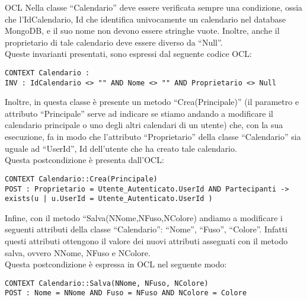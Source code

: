 \begin{listaPersonale}{OCL}
    Nella classe “Calendario” deve essere verificata sempre una condizione, ossia che l'IdCalendario, Id che identifica univocamente un calendario nel database MongoDB, e il suo nome non devono essere stringhe vuote. Inoltre, anche il proprietario di tale calendario deve essere diverso da “Null”.\\
    Queste invarianti presentati, sono espressi dal seguente codice OCL:
    \begin{lstlisting}
CONTEXT Calendario :
INV : IdCalendario <> "" AND Nome <> "" AND Proprietario <> Null
    \end{lstlisting}
    Inoltre, in questa classe è presente un metodo “Crea(Principale)” (il parametro e attributo “Principale” serve ad indicare se stiamo andando a modificare il calendario principale o uno degli altri calendari di un utente) che, con la sua esecuzione, fa in modo che l'attributo “Proprietario” della classe “Calendario” sia uguale ad “UserId”, Id dell'utente che ha creato tale calendario.\\
    Questa postcondizione è presenta dall'OCL:
    \begin{lstlisting}
CONTEXT Calendario::Crea(Principale)
POST : Proprietario = Utente_Autenticato.UserId AND Partecipanti -> exists(u | u.UserId = Utente_Autenticato.UserId )
    \end{lstlisting}
    Infine, con il metodo “Salva(NNome,NFuso,NColore) andiamo a modificare i seguenti attributi della classe “Calendario”: “Nome”, “Fuso”, “Colore”. Infatti questi attributi ottengono il valore dei nuovi attributi assegnati con il metodo salva, ovvero NNome, NFuso e NColore. \\
    Questa postcondizione è espressa in OCL nel seguente modo:
    \begin{lstlisting}
CONTEXT Calendario::Salva(NNome, NFuso, NColore)
POST : Nome = NNome AND Fuso = NFuso AND NColore = Colore
    \end{lstlisting}





\end{listaPersonale}
